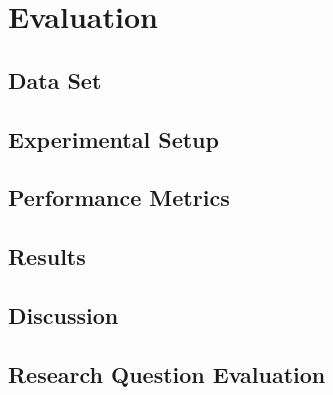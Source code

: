 \chapter{Evaluation}
\label{ch:evaluation}

\section{Data Set}
\label{sec:dataset}

\section{Experimental Setup}

\section{Performance Metrics}

\section{Results}
\label{sec:results}

\section{Discussion}

\section{Research Question Evaluation}
